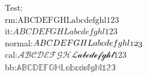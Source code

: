 Test:\\
rm:$\mathrm{ABCDEFGHL abcdefghl 123}$\\
it:$\mathit{ABCDEFGHL abcdefghl 123}$\\
normal:$\mathnormal{ABCDEFGHL abcdefghl 123}$\\
cal:$\mathcal{ABCDEFGHL abcdefghl 123}$\\
bb:$\mathbb{ABCDEFGHL abcdefghl 123}$\\
